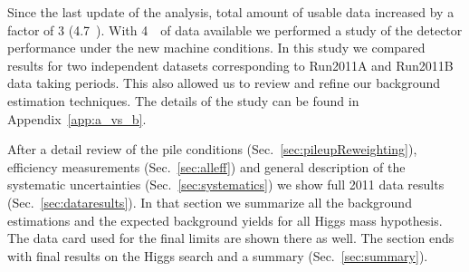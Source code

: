 Since the last update of the analysis, total amount of usable data
increased by a factor of 3 (4.7~\ifb{}). With 4~\ifb\ of data
available we performed a study of the detector performance under the
new machine conditions. In this study we compared results for two
independent datasets corresponding to Run2011A and Run2011B data
taking periods. This also allowed us to review and refine our
background estimation techniques. The details of the study can be
found in Appendix~\vref{app:a_vs_b}.

After a detail review of the pile conditions
(Sec.~\ref{sec:pileupReweighting}), efficiency measurements
(Sec.~\ref{sec:alleff}) and general description of the systematic
uncertainties (Sec.~\ref{sec:systematics}) we show full 2011 data
results (Sec.~\vref{sec:dataresults}). In that section we summarize all
the background estimations and the expected background yields for all
Higgs mass hypothesis. The data card used for the final limits are
shown there as well. The section ends with final results on the Higgs
search and a summary (Sec.~\ref{sec:summary}).
